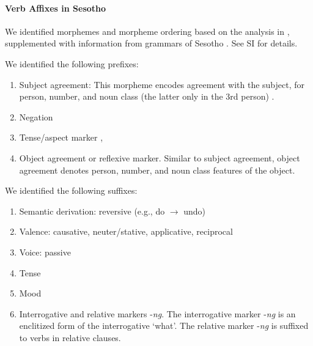 \paragraph{Verb Affixes in Sesotho}

We identified morphemes and morpheme ordering based on the analysis in \cite{demuth1992acquisition}, supplemented with information from grammars of Sesotho \citep{doke1967textbook,guma1971outline}. See SI for details.


We identified the following prefixes:

\begin{enumerate}
    \item Subject agreement: This morpheme encodes agreement with the subject, for person, number, and noun class (the latter only in the 3rd person) \cite[]{doke1967textbook}.
    
    \item Negation 
    
    \item Tense/aspect marker  \cite[p. 165-166]{guma1971outline}, \cite[-424]{doke1967textbook}
    
    \item Object agreement or reflexive marker. 
    Similar to subject agreement, object agreement denotes person, number, and noun class features of the object.
\end{enumerate}
We identified the following suffixes:
    
\begin{enumerate}
\item Semantic derivation: reversive (e.g., do $\rightarrow$ undo)
    \item Valence: causative,  neuter/stative, applicative, reciprocal
    
    \item Voice: passive
    
    
    \item Tense

     
    \item Mood
    

    \item Interrogative and relative markers -\textit{ng}.
    The interrogative marker -\textit{ng} is an enclitized form of the interrogative `what'.
    The relative marker -\textit{ng} is suffixed to verbs in relative clauses.
\end{enumerate}



